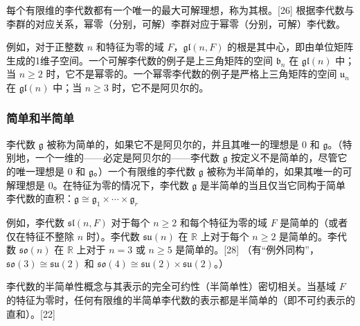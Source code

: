 每个有限维的李代数都有一个唯一的最大可解理想，称为其根。[26] 根据李代数与李群的对应关系，幂零（分别，可解）李群对应于幂零（分别，可解）李代数。

例如，对于正整数 \(n\) 和特征为零的域 \(F\)，\(\mathfrak{gl}(n,F)\) 的根是其中心，即由单位矩阵生成的1维子空间。一个可解李代数的例子是上三角矩阵的空间 \(\mathfrak{b}_n\) 在 \(\mathfrak{gl}(n)\) 中；当 \(n \geq 2\) 时，它不是幂零的。一个幂零李代数的例子是严格上三角矩阵的空间 \(\mathfrak{u}_n\) 在 \(\mathfrak{gl}(n)\) 中；当 \(n \geq 3\) 时，它不是阿贝尔的。
\subsubsection{简单和半简单}
李代数 \(\mathfrak{g}\) 被称为简单的，如果它不是阿贝尔的，并且其唯一的理想是 0 和 \(\mathfrak{g}\)。（特别地，一个一维的——必定是阿贝尔的——李代数 \(\mathfrak{g}\) 按定义不是简单的，尽管它的唯一理想是 0 和 \(\mathfrak{g}\)。）一个有限维的李代数 \(\mathfrak{g}\) 被称为半简单的，如果其唯一的可解理想是 0。在特征为零的情况下，李代数 \(\mathfrak{g}\) 是半简单的当且仅当它同构于简单李代数的直积：\(\mathfrak{g} \cong \mathfrak{g}_1 \times \cdots \times \mathfrak{g}_r
\)

例如，李代数 \(\mathfrak{sl}(n,F)\) 对于每个 \(n \geq 2\) 和每个特征为零的域 \(F\) 是简单的（或者仅在特征不整除 \(n\) 时）。李代数 \(\mathfrak{su}(n)\) 在 \(\mathbb{R}\) 上对于每个 \(n \geq 2\) 是简单的。李代数 \(\mathfrak{so}(n)\) 在 \(\mathbb{R}\) 上对于 \(n = 3\) 或 \(n \geq 5\) 是简单的。[28] （有“例外同构”，\(\mathfrak{so}(3) \cong \mathfrak{su}(2)\) 和 \(\mathfrak{so}(4) \cong \mathfrak{su}(2) \times \mathfrak{su}(2)\)。）

李代数的半简单性概念与其表示的完全可约性（半简单性）密切相关。当基域 \(F\) 的特征为零时，任何有限维的半简单李代数的表示都是半简单的（即不可约表示的直和）。[22]